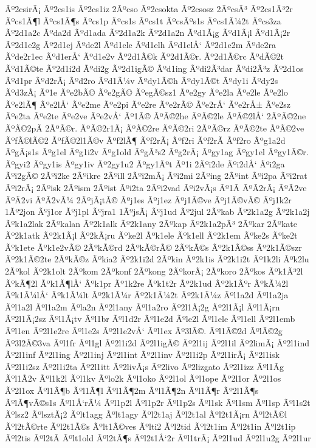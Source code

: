 {Ãº2csirÃ¡
Ãº2cs1is
Ãº2cs1iz
2Ãºcso
Ãº2csokta
Ãº2csosz
2ÃºcsÃ³
Ãº2cs1Ã³2r
Ãºcs1Ã¶l
Ãºcs1Ã¶s
Ãºcs1p
Ãºcs1s
Ãºcs1t
ÃºcsÃºs1s
Ãºcs1Ã¼2t
Ãºcs3za
Ãº2d1a2c
Ãºda2d
Ãºd1ada
Ãº2d1a2k
Ãº2d1a2n
Ãºd1Ã¡g
Ãºd1Ã¡l
Ãºd1Ã¡2r
Ãº2d1e2g
Ãº2d1ej
Ãºde2l
Ãºd1ele
Ãºd1elh
Ãºd1elÅ‘
Ãº2d1e2m
Ãºde2ra
Ãºde2r1ec
Ãºd1erÅ‘
Ãºd1e2v
Ãº2d1Ã©k
Ãº2d1Ã©r.
Ãº2d1Ã©rc
ÃºdÃ©2t
Ãºd1Ã©te
Ãº2d1i2d
Ãºdi2g
Ãº2d1igÃ©
Ãºd1ing
Ãºdi2Ã³dar
Ãºdi2Ã³z
Ãº2d1os
Ãºd1pr
Ãºd2rÃ¡
Ãºd2ro
Ãºd1Ã¼v
Ãºdy1Ã©h
Ãºdy1Ã©t
Ãºdy1i
Ãºdy2s
Ãºd3zÃ¡
Ãº1e
Ãºe2bÃ©
Ãºe2gÃ©
ÃºegÃ©sz1
Ãºe2gy
Ãºe2la
Ãºe2le
Ãºe2lo
Ãºe2lÃ¶
Ãºe2lÅ‘
Ãºe2me
Ãºe2pi
Ãºe2re
Ãºe2rÃ©
Ãºe2rÅ‘
Ãºe2rÅ±
Ãºe2sz
Ãºe2ta
Ãºe2te
Ãºe2ve
Ãºe2vÅ‘
Ãº1Ã©
ÃºÃ©2he
ÃºÃ©2le
ÃºÃ©2lÅ‘
2ÃºÃ©2ne
ÃºÃ©2pÃ­
2ÃºÃ©r.
ÃºÃ©2r1Ã¡
ÃºÃ©2re
ÃºÃ©2ri
2ÃºÃ©rz
ÃºÃ©2te
ÃºÃ©2ve
ÃºfÃ©lÃ©2
ÃºfÃ©2l1Ã©v
Ãºf2lÃ¶
Ãºf2rÃ¡
Ãºf2ri
Ãºf2rÃ­
Ãºf2ro
Ãºg1a2d
ÃºgÃ¡s1s
Ãºg1el
Ãºg1i2v
Ãºg1old
ÃºgÃ³s2
Ãºg2rÃ¡
Ãºgy1ag
Ãºgy1el
Ãºgy1Ã©r.
Ãºgyi2
Ãºgy1is
Ãºgy1iv
Ãº2gy1u2
Ãºgy1Ãºt
Ãº1i
2Ãºi2de
Ãºi2dÅ‘
Ãºi2ga
Ãºi2gÃ©
2Ãºi2ke
2Ãºikre
2Ãºill
2Ãºi2mÃ¡
Ãºi2mi
2Ãºing
2Ãºint
Ãºi2pa
Ãºi2rat
Ãºi2rÃ¡
2Ãºisk
2Ãºism
2Ãºist
Ãºi2ta
2Ãºi2vad
Ãºi2vÃ¡s
Ãº1Ã­
ÃºÃ­2rÃ¡
ÃºÃ­2ve
ÃºÃ­2vi
ÃºÃ­2vÃ¼
2ÃºjÃ¡tÃ©
Ãºj1es
Ãºj1ez
Ãºj1Ã©ve
Ãºj1Ã©vÃ©
Ãºj1k2r
1Ãº2jon
Ãºj1or
Ãºj1pl
Ãºjra1
1ÃºjsÃ¡
Ãºj1ud
Ãº2jul
2Ãºkab
Ãº2k1a2g
Ãº2k1a2j
Ãºk1a2lak
2Ãºkalan
Ãº2k1alk
Ãº2k1any
2Ãºkap
Ãº2k1a2pÃ³
2Ãºkar
2Ãºkate
Ãº2k1atk
Ãº2k1Ã¡l
Ãº2kÃ¡ru
Ãºke2l
Ãºk1ele
Ãºk1ell
Ãº2k1em
Ãºke2s
Ãºke2t
Ãºk1ete
Ãºk1e2vÃ©
2ÃºkÃ©rd
2ÃºkÃ©rÃ©
2ÃºkÃ©s
Ãº2k1Ã©ss
Ãº2k1Ã©szr
Ãº2k1Ã©2te
2ÃºkÃ©z
Ãºkia2
Ãº2k1i2d
2Ãºkin
Ãº2k1is
Ãº2k1i2t
Ãº1k2li
Ãºk2lu
2Ãºkol
Ãº2k1olt
2Ãºkom
2Ãºkonf
2Ãºkong
2ÃºkorÃ¡
2Ãºkoro
2Ãºkos
Ãºk1Ã³2l
ÃºkÃ¶2l
Ãºk1Ã¶lÅ‘
Ãºk1pr
Ãº1k2re
Ãºk1t2r
Ãº2k1ud
Ãº2k1Ãºr
ÃºkÃ¼2l
Ãºk1Ã¼lÅ‘
Ãºk1Ã¼lt
Ãº2k1Ã¼r
Ãº2k1Ã¼2t
Ãº2k1Ã¼z
Ãºl1a2d
Ãºl1a2ja
Ãºl1a2l
Ãºl1a2m
Ãºla2n
Ãº2l1any
Ãºl1a2ro
Ãº2l1Ã¡2g
Ãº2l1Ã¡l
Ãºl1Ã¡rn
Ãº2l1Ã¡2sz
Ãºl1Ã¡tv
Ãºl1br
Ãºl1d2r
Ãºl1e2d
Ãºle2l
Ãºl1ele
Ãºl1ell
Ãº2l1emb
Ãºl1en
Ãº2l1e2re
Ãºl1e2s
Ãº2l1e2vÅ‘
Ãºl1ex
Ãº3lÃ©.
Ãºl1Ã©2d
ÃºlÃ©2g
Ãº3l2Ã©3va
Ãºl1fr
Ãºl1gl
Ãº2l1i2d
Ãº2l1igÃ©
Ãº2l1ij
Ãº2l1il
Ãº2limÃ¡
Ãº2l1ind
Ãº2l1inf
Ãº2l1ing
Ãº2l1inj
Ãº2l1int
Ãº2l1inv
Ãº2l1i2p
Ãº2l1irÃ¡
Ãº2l1isk
Ãº2l1i2sz
Ãº2l1i2ta
Ãº2l1itt
Ãº2livÃ¡s
Ãº2livo
Ãº2lizgato
Ãº2l1izz
Ãºl1Ã­g
Ãºl1Ã­2v
Ãºl1k2l
Ãºl1kv
Ãºlo2k
Ãºl1oko
Ãº2l1ol
Ãºl1ope
Ãº2l1or
Ãº2l1os
Ãº2l1ox
Ãºl1Ã¶b
Ãºl1Ã¶l
Ãºl1Ã¶2m
Ãºl1Ã¶2n
Ãºl1Ã¶r
Ãº2l1Ã¶s
ÃºlÃ¶vÃ©s1s
Ãºl1Å‘rÃ¼
Ãºl1p2l
Ãºl1p2r
Ãºl1p2s
Ãºl1sk
Ãºl1sm
Ãºl1sp
Ãºl1s2t
Ãºlsz2
ÃºlsztÃ¡2
Ãºlt1agg
Ãºlt1agy
Ãºl2t1aj
Ãºl2t1al
Ãºl2t1Ã¡rn
Ãºl2tÃ©l
Ãºl2tÃ©rte
Ãºl2t1Ã©s
Ãºlt1Ã©ves
Ãºlti2
Ãºl2tid
Ãºl2t1im
Ãºl2t1in
Ãºl2t1ip
Ãºl2tis
Ãºl2tÃ­
Ãºlt1old
Ãºl2tÃ¶s
Ãºl2t1Å‘2r
Ãºl1trÃ¡
Ãº2l1ud
Ãº2l1u2g
Ãº2l1ur
}
